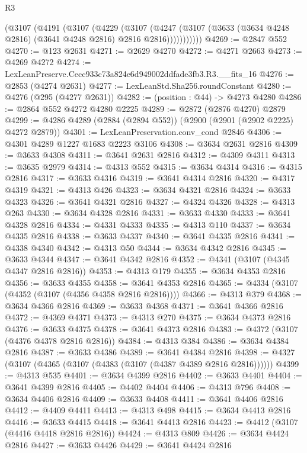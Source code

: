 \begin{lexlean}{R3}
\begin{coremodule}
          (@3107
            (@4191
              (@3107
                (@4229
                  (@3107
                    (@4247
                      (@3107 (@3633 (@3634 @4248 @2816) (@3641 @4248 @2816) @2816 @2816)))))))))))
@4269 := @2847 @552
@4270 := @123 @2631
@4271 := @2629 @4270
@4272 := @4271 @2663
@4273 := @4269 @4272
@4274 := LexLeanPreserve.Cecc933c73a824e6d949002ddfade3fb3.R3.__fits_16
@4276 := @2853 (@4274 @2631)
@4277 := LexLeanStd.Sha256.roundConstant
@4280 := @4276 (@295 (@4277 @2631))
@4282 := (position : @44) -> @4273 @4280
@4286 := @2864 @552 @4272 @4280 @2225
@4289 := @2872 (@2876 @4270) @2879
@4299 := @4286 @4289 (@2884 (@2894 @552)) (@2900 (@2901 (@2902 @2225) @4272 @2879))
@4301 := LexLeanPreservation.conv_cond @2846
@4306 := @4301 @4289 @1227 @1683 @2223 @3106
@4308 := @3634 @2631 @2816
@4309 := @3633 @4308
@4311 := @3641 @2631 @2816
@4312 := @4309 @4311
@4313 := @3635 @2979
@4314 := @4313 @552
@4315 := @3634 @4314
@4316 := @4315 @2816
@4317 := @3633 @4316
@4319 := @3641 @4314 @2816
@4320 := @4317 @4319
@4321 := @4313 @426
@4323 := @3634 @4321 @2816
@4324 := @3633 @4323
@4326 := @3641 @4321 @2816
@4327 := @4324 @4326
@4328 := @4313 @263
@4330 := @3634 @4328 @2816
@4331 := @3633 @4330
@4333 := @3641 @4328 @2816
@4334 := @4331 @4333
@4335 := @4313 @110
@4337 := @3634 @4335 @2816
@4338 := @3633 @4337
@4340 := @3641 @4335 @2816
@4341 := @4338 @4340
@4342 := @4313 @50
@4344 := @3634 @4342 @2816
@4345 := @3633 @4344
@4347 := @3641 @4342 @2816
@4352 := @4341 (@3107 (@4345 @4347 @2816 @2816))
@4353 := @4313 @179
@4355 := @3634 @4353 @2816
@4356 := @3633 @4355
@4358 := @3641 @4353 @2816
@4365 := @4334 (@3107 (@4352 (@3107 (@4356 @4358 @2816 @2816))))
@4366 := @4313 @379
@4368 := @3634 @4366 @2816
@4369 := @3633 @4368
@4371 := @3641 @4366 @2816
@4372 := @4369 @4371
@4373 := @4313 @270
@4375 := @3634 @4373 @2816
@4376 := @3633 @4375
@4378 := @3641 @4373 @2816
@4383 := @4372 (@3107 (@4376 @4378 @2816 @2816))
@4384 := @4313 @384
@4386 := @3634 @4384 @2816
@4387 := @3633 @4386
@4389 := @3641 @4384 @2816
@4398 := @4327 (@3107 (@4365 (@3107 (@4383 (@3107 (@4387 @4389 @2816 @2816))))))
@4399 := @4313 @535
@4401 := @3634 @4399 @2816
@4402 := @3633 @4401
@4404 := @3641 @4399 @2816
@4405 := @4402 @4404
@4406 := @4313 @796
@4408 := @3634 @4406 @2816
@4409 := @3633 @4408
@4411 := @3641 @4406 @2816
@4412 := @4409 @4411
@4413 := @4313 @498
@4415 := @3634 @4413 @2816
@4416 := @3633 @4415
@4418 := @3641 @4413 @2816
@4423 := @4412 (@3107 (@4416 @4418 @2816 @2816))
@4424 := @4313 @809
@4426 := @3634 @4424 @2816
@4427 := @3633 @4426
@4429 := @3641 @4424 @2816

\end{coremodule}
\end{lexlean}

